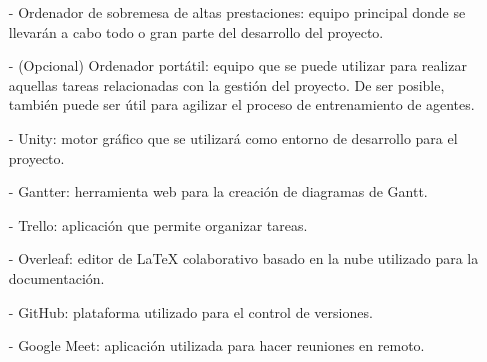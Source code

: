 \begin{enumerate}
    \item[-] Ordenador de sobremesa de altas prestaciones: equipo principal donde se llevarán a cabo todo o gran parte del desarrollo del proyecto.
    \item[-] (Opcional) Ordenador portátil: equipo que se puede utilizar para realizar aquellas tareas relacionadas con la gestión del proyecto. De ser posible, también puede ser útil para agilizar el proceso de entrenamiento de agentes.
    \item[-] Unity: motor gráfico que se utilizará como entorno de desarrollo para el proyecto.
    \item[-] Gantter: herramienta web para la creación de diagramas de Gantt.
    \item[-] Trello: aplicación que permite organizar tareas.
    \item[-] Overleaf: editor de LaTeX colaborativo basado en la nube utilizado para la documentación.
    \item[-] GitHub: plataforma utilizado para el control de versiones.
    \item[-] Google Meet: aplicación utilizada para hacer reuniones en remoto.
\end{enumerate}

